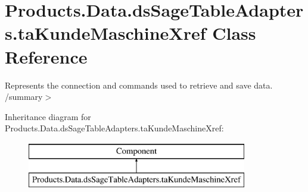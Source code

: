 \hypertarget{class_products_1_1_data_1_1ds_sage_table_adapters_1_1ta_kunde_maschine_xref}{}\section{Products.\+Data.\+ds\+Sage\+Table\+Adapters.\+ta\+Kunde\+Maschine\+Xref Class Reference}
\label{class_products_1_1_data_1_1ds_sage_table_adapters_1_1ta_kunde_maschine_xref}


Represents the connection and commands used to retrieve and save data. /summary$>$  


Inheritance diagram for Products.\+Data.\+ds\+Sage\+Table\+Adapters.\+ta\+Kunde\+Maschine\+Xref\+:\begin{figure}[H]
\begin{center}
\leavevmode
\includegraphics[height=2.000000cm]{class_products_1_1_data_1_1ds_sage_table_adapters_1_1ta_kunde_maschine_xref}
\end{center}
\end{figure}
